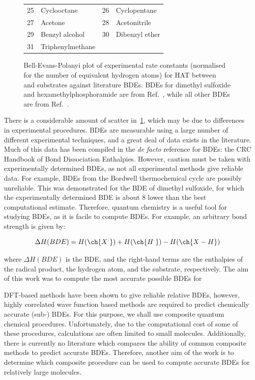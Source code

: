 \begin{figure}[H]
\begin{tabularx}{\textwidth}{| l X l X |}
  25 & Cyclooctane & 26 & Cyclopentane  \\
  27 & Acetone & 28 & Acetonitrile \\
  29 & Benzyl alcohol & 30 & Dibenzyl ether \\
  31 & Triphenylmethane & & \\
  \hline
\end{tabularx}
  \caption[Bell-Evans-Polanyi plot of experimental rate constants against literature BDEs.]{Bell-Evans-Polanyi plot of experimental rate constants (normalised for the number of equivalent hydrogen atoms) for HAT between \cumo~ and substrates against literature BDEs. BDEs for dimethyl sulfoxide and hexamethylphosphoramide are from Ref.~\protect{}, while all other BDEs are from Ref.~\protect{}.}
\label{fig:bep-expt}
\end{figure}

There is a considerable amount of scatter in~\ref{fig:bep-expt}, which may be due to differences in experimental procedures. BDEs are measurable using a large number of different experimental techniques, and a great deal of data exists in the literature. Much of this data has been compiled in the \emph{de facto} reference for BDEs: the CRC Handbook of Bond Dissociation Enthalpies.\cite{Luo2002} However, caution must be taken with experimentally determined BDEs, as not all experimental methods give reliable data. For example, BDEs from the Bordwell\cite{Bordwell1988} thermochemical cycle are possibly unreliable.\cite{Salamone2012, Miller2016} This was demonstrated for the BDE of dimethyl sulfoxide, for which the experimentally determined BDE is about 8 \kcalmol lower than the best computational estimate.\cite{Salamone2012} Therefore, quantum chemistry is a useful tool for studying BDEs, as it is facile to compute BDEs. For example, an arbitrary  bond strength is given by:

\begin{equation}
  \Delta H(BDE) =  H(\ch{X^.}) + H(\ch{H^.}) - H(\ch{X-H})
\end{equation}

\noindent where $\Delta H(BDE)$ is the BDE, and the right-hand terms are the enthalpies of the radical product, the hydrogen atom, and the substrate, respectively. The aim of this work was to compute the most accurate possible BDEs for

DFT-based methods have been shown to give reliable relative BDEs, however, highly correlated wave function based methods are required to predict chemically accurate (sub-\kcalmol) BDEs.\cite{DiLabio1999, Chan2012, Wiberg2014} For this purpose, we shall use composite quantum chemical procedures. Unfortunately, due to the computational cost of some of these procedures, calculations are often limited to small molecules. Additionally, there is currently no literature which compares the ability of common composite methods to predict accurate BDEs. Therefore, another aim of the work is to determine which composite procedure can be used to compute accurate BDEs for relatively large molecules.

